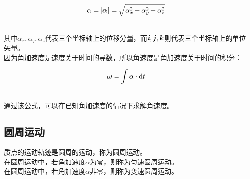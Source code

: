 \documentclass[UTF8]{ctexart}
\newcommand*{\veb}[1]{\vb*{#1}}
\newcommand*{\dif}{\mathop{}\!\mathrm{d}}
\begin{document}
    \begin{large}
        \begin{equation*}
            \alpha=|\veb{\alpha}|=\sqrt{\alpha_x^2+\alpha_y^2+\alpha_z^2}
        \end{equation*}
    \end{large}\\
    其中$\alpha_x,\alpha_y,\alpha_z$代表三个坐标轴上的位移分量，而$\veb{i},\veb{j},\veb{k}$则代表三个坐标轴上的单位矢量。\\[4mm]
    因为角加速度是速度关于时间的导数，所以角速度是角加速度关于时间的积分：\vspace{5pt}
    \begin{large}
        \begin{equation*}
            \veb{\omega}=\int \veb{\alpha}\cdot\dif t
        \end{equation*}
    \end{large}\\
    通过该公式，可以在已知角加速度的情况下求解角速度。

\newpage

\subsection{圆周运动}
    质点的运动轨迹是圆周的运动，称为圆周运动。\\[3mm]
    在圆周运动中，若角加速度$\alpha$为零，则称为匀速圆周运动。\\[3mm]
    在圆周运动中，若角加速度$\alpha$非零，则称为变速圆周运动。
\end{document}
